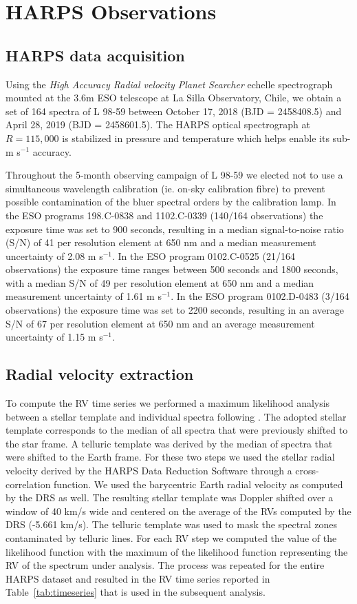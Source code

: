 \documentclass[longauth]{aa}
\newcommand{\mps}{m s$^{-1}$}
\begin{document}
\section{HARPS Observations}
\label{sec:rv}
\subsection{HARPS data acquisition}
Using the \textit{High Accuracy Radial velocity Planet Searcher} \citep[HARPS;][]{mayor03} echelle spectrograph mounted at the 3.6m ESO telescope at La Silla Observatory, Chile, we obtain a set of 164 spectra of L 98-59 between October 17, 2018 (BJD = 2458408.5) and April 28, 2019 (BJD = 2458601.5). The HARPS optical spectrograph at $R=115,000$ is stabilized in pressure and temperature which helps enable its sub-\mps{} accuracy. 

Throughout the 5-month observing campaign of L 98-59 we elected not to use a simultaneous wavelength calibration 
(ie. on-sky calibration fibre) to prevent possible contamination of the bluer spectral orders by the calibration lamp. In the ESO programs 198.C-0838 and 1102.C-0339 (140/164 observations) the exposure time was set to 900 seconds, resulting in a median signal-to-noise ratio (S/N) of 41 per resolution element at 650 nm and a median measurement uncertainty of 2.08 \mps{.} In the ESO program 0102.C-0525 (21/164 observations) the exposure time ranges between 500 seconds and 1800 seconds, with a median S/N of 49 per resolution element at 650 nm and a median measurement uncertainty of 1.61 \mps{.} In the ESO program 0102.D-0483 (3/164 observations) the exposure time was set to 2200 seconds, resulting in an average S/N of 67 per resolution element at 650 nm and an average measurement uncertainty of 1.15 \mps{.}

\subsection{Radial velocity extraction}
To compute the RV time series we performed a maximum likelihood analysis between a stellar
template and individual spectra following \citet{astudillodefru17a}. The adopted stellar template corresponds
to the median of all spectra that were previously shifted to the star frame. A telluric template was 
derived by the median of spectra that were shifted to the Earth frame. For these two steps we used the 
stellar radial velocity derived by the HARPS Data Reduction Software \citep[DRS;][]{lovis07} through a cross-correlation
function. We used the barycentric Earth radial velocity as computed by the DRS as well. The resulting stellar template 
was Doppler shifted over a window of 40 km/s wide and centered on the average of the RVs 
computed by the DRS (-5.661 km/s). The telluric template was used to mask the spectral zones contaminated 
by telluric lines. For each RV step we computed the value of the likelihood function with the maximum of the 
likelihood
function representing the RV of the spectrum under analysis. The process was repeated for the entire HARPS
dataset and resulted in the RV time series reported in Table~\ref{tab:timeseries} that is used in the subsequent
analysis.
\end{document}
